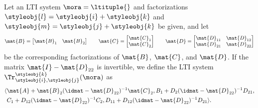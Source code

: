 \begin{ctdefinition}\label{def:trace-lti}
    Let an LTI system $\mora = \ltituple{}$ and factorizations $\styleobj{l} = \styleobj{i} + \styleobj{k}$ and $\styleobj{m} = \styleobj{j} + \styleobj{k}$ be given, and let
    \begin{equation}\label{eq:LTI-induced-block-forms}
        \mat{B} =
        \begin{bmatrix}
            \mat{B}_1 & \mat{B}_2
        \end{bmatrix}
        \qquad
        \mat{C} =
        \begin{bmatrix}
            \mat{C}_1 \\
            \mat{C}_2
        \end{bmatrix}
        \qquad
        \mat{D} =
        \begin{bmatrix}
            \mat{D}_{11} & \mat{D}_{12} \\
            \mat{D}_{21} & \mat{D}_{22}
        \end{bmatrix}
    \end{equation}
    be the corresponding factorizations of $\mat{B}$, $\mat{C}$, and $\mat{D}$.
    If the matrix $\mat{I} - \mat{D}_{22}$ is invertible, we define the LTI system $\Tr_{\styleobj{i},\styleobj{j}}^{\styleobj{k}}(\mora)$ as
    \begin{equation}
        \begin{aligned}
            \langle  & \mat{A} + \mat{B}_2 (\idmat- \mat{D}_{22})^{-1} \mat{C}_2 , B_1 + D_2(\idmat- \mat{D}_{22})^{-1}
            D_{21}, \\
                                  & C_1 + D_{12}(\idmat- \mat{D}_{22})^{-1}C_2, D_{11} + D_{12}(\idmat- \mat{D}_{22})^{-1}D_{21} \rangle.
        \end{aligned}
    \end{equation}
\end{ctdefinition}

